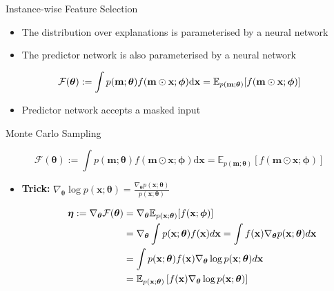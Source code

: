 \documentclass[11pt,compress,t,notes=noshow, aspectratio=169, xcolor=table]{beamer}
\begin{document}
	
\begin{frame}{Instance-wise Feature Selection}
\begin{itemize}
    \item The distribution over explanations is parameterised by a neural network
    \item The predictor network is also parameterised by a neural network
\end{itemize}
\bigskip
\begin{equation*}
             \centering
    \mathcal{F}(\boldsymbol{\theta}):=\int p(\mathbf{m} ; \boldsymbol{\theta}) f(\mathbf{m} \odot \mathbf{x} ; \boldsymbol{\phi}) \mathrm{d} \mathbf{x}=\mathbb{E}_{p(\mathbf{m} ; \boldsymbol{\theta})}[f(\mathbf{m} \odot \mathbf{x} ; \boldsymbol{\phi})]
\end{equation*}

\bigskip

\begin{itemize}
    \item Predictor network accepts a masked input
\end{itemize}
\end{frame}

\begin{frame}{Monte Carlo Sampling}
 
$$
\mathcal{F}(\boldsymbol{\theta}):=\int p(\mathbf{m} ; \boldsymbol{\theta}) f(\mathbf{m} \odot \mathbf{x} ; \boldsymbol{\phi}) \mathrm{d} \mathbf{x}=\mathbb{E}_{p(\mathbf{m} ; \boldsymbol{\theta})}[f(\mathbf{m} \odot \mathbf{x} ; \boldsymbol{\phi})] 
$$


    \begin{itemize}
        \item \textbf{Trick:} $\nabla_{\boldsymbol{\theta}} \log p(\mathbf{x} ; \boldsymbol{\theta})=\frac{\nabla_{\boldsymbol{\theta}} p(\mathbf{x} ; \boldsymbol{\theta})}{p(\mathbf{x} ; \boldsymbol{\theta})}$
    \end{itemize}
$$
\bigskip
    \begin{aligned}
        \,\,\,\,\,\,\,\,\,\,\,\,\,\,\,\,
        \boldsymbol{\eta}:=\nabla_{\boldsymbol{\theta}} \mathcal{F}(\boldsymbol{\theta}) &=\nabla_{\boldsymbol{\theta}} \mathbb{E}_{p(\mathbf{x} ; \boldsymbol{\theta})}[f(\mathbf{x} ; \boldsymbol{\phi})] \\
        &=\nabla_{\boldsymbol{\theta}} \int p(\mathbf{x} ; \boldsymbol{\theta}) f(\mathbf{x}) d \mathbf{x}=\int f(\mathbf{x}) \nabla_{\boldsymbol{\theta}} p(\mathbf{x} ; \boldsymbol{\theta}) d \mathbf{x} \\
        &=\int p(\mathbf{x} ; \boldsymbol{\theta}) f(\mathbf{x}) \nabla_{\boldsymbol{\theta}} \log p(\mathbf{x} ; \boldsymbol{\theta}) d \mathbf{x} \\
        &=\mathbb{E}_{p(\mathbf{x} ; \boldsymbol{\theta})}\left[f(\mathbf{x}) \nabla_{\boldsymbol{\theta}} \log p(\mathbf{x} ; \boldsymbol{\theta})\right]
    \end{aligned}
$$
\end{frame}
\end{document}
